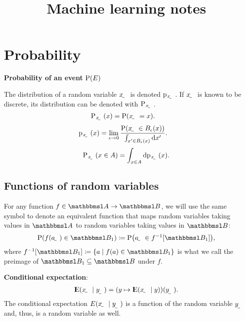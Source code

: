 \documentclass{article}
\title{Machine learning notes}
\author{}
\date{}
\begin{document}
\maketitle

\tableofcontents

\newpage

\begingroup
\onehalfspacing
\printunsrtglossary[type=symbols,style=supergroup,title={Notation}]
\endgroup




\section{Probability}


\textbf{Probability of an event} $\P(E)$

The distribution of a random variable $\rvar x$ is denoted $\p_\rvar{x}$. If $\rvar x$ is known to be discrete, its distribution can be denoted with $\P_\rvar{x}$. 
\begin{align}
    \P_\rvar{x}(x) &= \P(\rvar x = x) \text.
\end{align}
\begin{align}
    \p_\rvar{x}(x) &= \lim_{\epsilon\to0}\frac{\P\del{\rvar x\in B_\epsilon(x)}}{\int_{x'\in B_\epsilon(x)}\dif x'} \text.
\end{align}
\begin{align}
    \P_\rvar{x}(x\in A) = \int_{x\in A}\dif \p_\rvar{x}(x) \text.
\end{align}

\subsection{Functions of random variables}

For any function $f\in \set A\to\set B$, we will use the same symbol to denote an equivalent function that maps random variables taking values in $\set A$ to random variables taking values in $\set B$:
\begin{align}
    \P(f(\rvar a)\in \set B_1) \coloneqq \P\del{\rvar a\in f^{-1}\sbr{\set B_1}} \text,
\end{align}
where $f^{-1}\sbr{\set B_1} \coloneqq \cbr{a\mid f(a)\in \set B_1}$ is what we call the preimage of $\set B_1\subseteq\set B$ under $f$.

\textbf{Conditional expectation}:
\begin{align}
    \E\del{\rvar x\mid\rvar y} = \del{y\mapsto \E\del{\rvar x\mid y}}(\rvar{y}) \text.
\end{align}
The conditional expectation $E\del{\rvar x\mid\rvar y}$ is a function of the random variable $\rvar y$ and, thus, is a random variable as well. 
\end{document}
